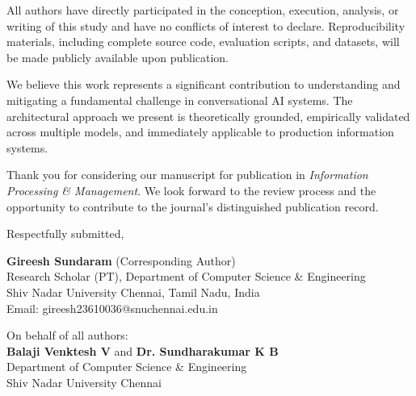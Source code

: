 \documentclass[a4paper]{article}
\begin{document}
All authors have directly participated in the conception, execution, analysis, or writing of this study and have no conflicts of interest to declare. Reproducibility materials, including complete source code, evaluation scripts, and datasets, will be made publicly available upon publication.

\vspace{0.5cm}

We believe this work represents a significant contribution to understanding and mitigating a fundamental challenge in conversational AI systems. The architectural approach we present is theoretically grounded, empirically validated across multiple models, and immediately applicable to production information systems.

Thank you for considering our manuscript for publication in \textit{Information Processing \& Management}. We look forward to the review process and the opportunity to contribute to the journal's distinguished publication record.

\vspace{0.8cm}

\noindent Respectfully submitted,

\vspace{0.5cm}

\noindent \textbf{Gireesh Sundaram} (Corresponding Author)\\
Research Scholar (PT), Department of Computer Science \& Engineering\\
Shiv Nadar University Chennai, Tamil Nadu, India\\
Email: gireesh23610036@snuchennai.edu.in

\vspace{0.3cm}

\noindent On behalf of all authors:\\
\textbf{Balaji Venktesh V} and \textbf{Dr. Sundharakumar K B}\\
Department of Computer Science \& Engineering\\
Shiv Nadar University Chennai
\end{document}
